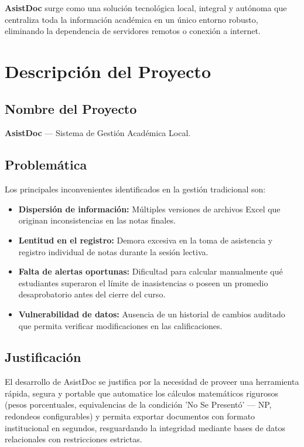 \documentclass[12pt,a4paper]{article}
\begin{document}
\textbf{AsistDoc} surge como una solución tecnológica local, integral y autónoma que centraliza toda la información académica en un único entorno robusto, eliminando la dependencia de servidores remotos o conexión a internet.

\section{Descripción del Proyecto}

\subsection{Nombre del Proyecto}
\textbf{AsistDoc} — Sistema de Gestión Académica Local.

\subsection{Problemática}
Los principales inconvenientes identificados en la gestión tradicional son:
\begin{itemize}
    \item \textbf{Dispersión de información:} Múltiples versiones de archivos Excel que originan inconsistencias en las notas finales.
    \item \textbf{Lentitud en el registro:} Demora excesiva en la toma de asistencia y registro individual de notas durante la sesión lectiva.
    \item \textbf{Falta de alertas oportunas:} Dificultad para calcular manualmente qué estudiantes superaron el límite de inasistencias o poseen un promedio desaprobatorio antes del cierre del curso.
    \item \textbf{Vulnerabilidad de datos:} Ausencia de un historial de cambios auditado que permita verificar modificaciones en las calificaciones.
\end{itemize}

\subsection{Justificación}
El desarrollo de AsistDoc se justifica por la necesidad de proveer una herramienta rápida, segura y portable que automatice los cálculos matemáticos rigurosos (pesos porcentuales, equivalencias de la condición 'No Se Presentó' — NP, redondeos configurables) y permita exportar documentos con formato institucional en segundos, resguardando la integridad mediante bases de datos relacionales con restricciones estrictas.
\end{document}
